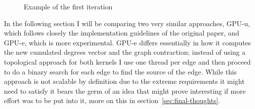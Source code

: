 \documentclass[a4paper,10pt]{article}
\begin{document}
\begin{figure}
	
	\caption{Example of the first iteration}\label{tikz:first-iteration}
\end{figure}
In the following section I will be comparing two very similar approaches, GPU-u, which follows
closely the implementation guidelines of the original paper, and GPU-e, which is more experimental.
GPU-e differs essentially in how it computes the new cumulated degrees vector and the graph
contraction; instead of using a topological approach for both kernels I use one thread per edge and
then proceed to do a binary search for each edge to find the source of the edge. While this approach
is not scalable by definition due to the extreme requirements it might need to satisfy it bears the
germ of an idea that might prove interesting if more effort was to be put into it, more on this in
section~\ref{sec:final-thoughts}.
\end{document}
